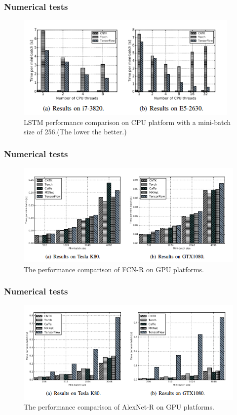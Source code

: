 \begin{frame}
	\MyLogo
	\frametitle{Numerical tests}  
	\begin{figure}[htbp] 
		\includegraphics[height=2in]{figures/LSTM1.png} 
		\caption{LSTM performance comparison on CPU platform with a mini-batch size of 256.(The lower the better.)}
	\end{figure}
\end{frame}

%

\begin{frame}
	\MyLogo
	\frametitle{Numerical tests}  
	\begin{figure}[htbp] 
		\includegraphics[height=2in]{figures/FCN-R2.png} 
		\caption{The performance comparison of FCN-R on GPU platforms.}
	\end{figure}
\end{frame}

%

\begin{frame}
	\MyLogo
	\frametitle{Numerical tests}  
	\begin{figure}[htbp] 
		\includegraphics[height=2in]{figures/AlexNet-R2.png} 
		\caption{The performance comparison of AlexNet-R on GPU platforms.}
	\end{figure}
\end{frame}

